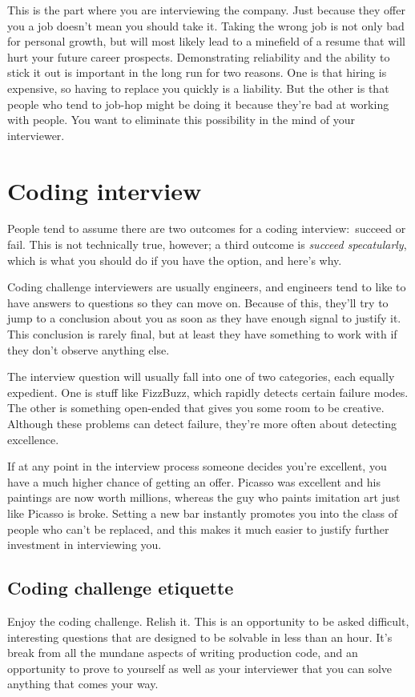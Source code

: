 \documentclass{article}
\begin{document}
    This is the part where you are interviewing the company. Just because they
    offer you a job doesn't mean you should take it. Taking the wrong job is
    not only bad for personal growth, but will most likely lead to a minefield
    of a resume that will hurt your future career prospects. Demonstrating
    reliability and the ability to stick it out is important in the long run
    for two reasons. One is that hiring is expensive, so having to replace you
    quickly is a liability. But the other is that people who tend to job-hop
    might be doing it because they're bad at working with people. You want to
    eliminate this possibility in the mind of your interviewer.

\section{Coding interview}\label{sec:coding-interview}
  People tend to assume there are two outcomes for a coding interview:~succeed
  or fail. This is not technically true, however; a third outcome is {\em
  succeed specatularly}, which is what you should do if you have the option,
  and here's why.

  Coding challenge interviewers are usually engineers, and engineers tend to
  like to have answers to questions so they can move on. Because of this,
  they'll try to jump to a conclusion about you as soon as they have enough
  signal to justify it. This conclusion is rarely final, but at least they have
  something to work with if they don't observe anything else.

  The interview question will usually fall into one of two categories, each
  equally expedient. One is stuff like FizzBuzz, which rapidly detects certain
  failure modes. The other is something open-ended that gives you some room to
  be creative. Although these problems can detect failure, they're more often
  about detecting excellence.

  If at any point in the interview process someone decides you're excellent,
  you have a much higher chance of getting an offer. Picasso was excellent and
  his paintings are now worth millions, whereas the guy who paints imitation
  art just like Picasso is broke. Setting a new bar instantly promotes you into
  the class of people who can't be replaced, and this makes it much easier to
  justify further investment in interviewing you.

\subsection{Coding challenge etiquette}
    Enjoy the coding challenge. Relish it. This is an opportunity to be asked
    difficult, interesting questions that are designed to be solvable in less
    than an hour. It's break from all the mundane aspects of writing production
    code, and an opportunity to prove to yourself as well as your interviewer
    that you can solve anything that comes your way.
\end{document}
